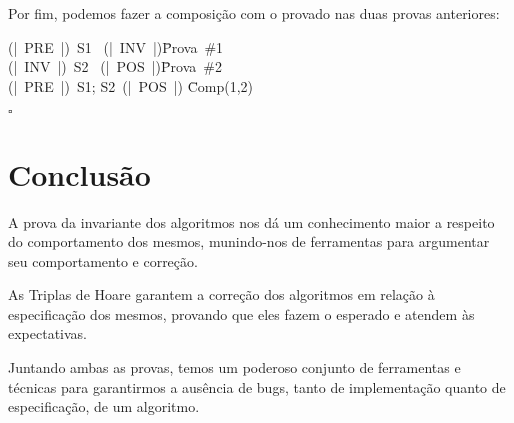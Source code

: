 \documentclass[12pt]{article}
\begin{document}
Por fim, podemos fazer a composição com o provado nas duas provas anteriores:
\begin{proofbox}
  \:(|\ PRE\ |)\ S1 \ (|\ INV\ |)\= Prova\ \#1 \\
  \:(|\ INV\ |)\ S2 \ (|\ POS\ |)\= Prova\ \#2 \\
  \:(|\ PRE\ |)\ S1; S2\ (|\ POS\ |) \= Comp(1,2)  \\
\end{proofbox}
\hfill $\square$

\section{Conclusão}

A prova da invariante dos algoritmos nos dá um conhecimento maior a respeito do
comportamento dos mesmos, munindo-nos de ferramentas para argumentar seu
comportamento e correção.

As Triplas de Hoare garantem a correção dos algoritmos em relação à
especificação dos mesmos, provando que eles fazem o esperado e atendem às
expectativas.

Juntando ambas as provas, temos um poderoso conjunto de ferramentas e técnicas
para garantirmos a ausência de bugs, tanto de implementação quanto de
especificação, de um algoritmo.



\end{document}
